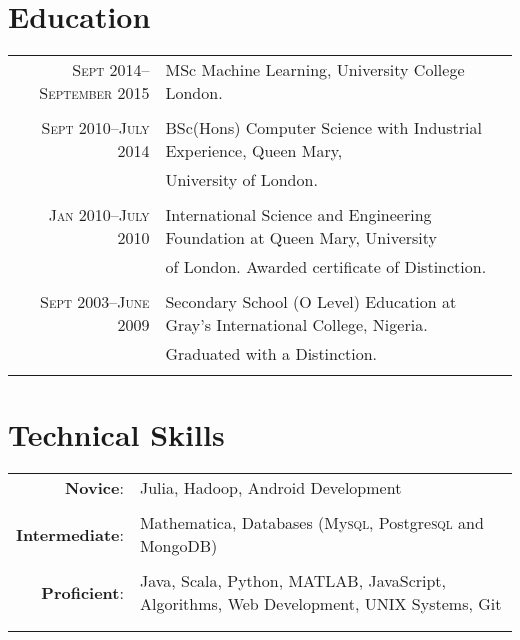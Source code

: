 \documentclass[a4paper,10pt]{article}
\begin{document}
\section{Education}
\begin{tabular}{rl}
  \textsc{Sept} 2014--\textsc{September} 2015 & MSc Machine Learning, University College London.\\&\\

  \textsc{Sept} 2010--\textsc{July} 2014 & BSc(Hons) Computer Science with Industrial Experience,
  Queen Mary,\\& University of London.\\&\\

  \textsc{Jan} 2010--\textsc{July} 2010 & International Science and Engineering Foundation at
  Queen Mary, University\\& of London. Awarded certificate of Distinction.\\&\\

  \textsc{Sept} 2003--\textsc{June} 2009 & Secondary School (O Level) Education at Gray’s
  International College, Nigeria.\\& Graduated with a Distinction.\\\\
\end{tabular}

\section{Technical Skills}
\begin{tabular}{rl}
  \textbf{Novice}:       & Julia, Hadoop, Android Development\\\\
  \textbf{Intermediate}: & Mathematica, Databases (My\textsc{sql}, Postgre\textsc{sql} and
  MongoDB)\\\\
  \textbf{Proficient}:   & Java, Scala, Python, MATLAB, JavaScript, Algorithms, Web Development,
  UNIX Systems, Git\\\\\\
\end{tabular}
\end{document}
